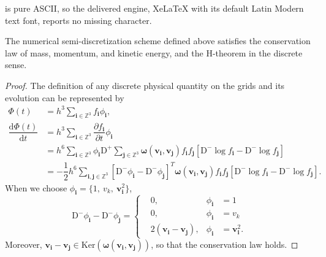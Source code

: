 \documentclass[10pt,a4paper]{amsart}
\begin{document}
is pure ASCII, so the delivered engine, XeLaTeX with its default Latin Modern text font, reports no missing character.
\begin{proposition}
    The numerical semi-discretization scheme defined above satisfies the conservation law of mass, momentum, and kinetic energy, and the H-theorem in the discrete sense.
\end{proposition}

\begin{proof}
The definition of any discrete physical quantity on the grids and its evolution can be represented by
\begin{equation}
    \begin{aligned}
        \Phi(t) &= h^{3} \sum_{\boldsymbol{i}\in\mathbb{Z}^{3}} f_{\boldsymbol{i}} \phi_{\boldsymbol{i}} , \\
        \dfrac{\mathrm{d} \Phi(t)}{\mathrm{d} t} &=  h^{3} \sum_{\boldsymbol{i}\in\mathbb{Z}^{3}} \dfrac{\partial f_{\boldsymbol{i}}}{\partial t} \phi_{\boldsymbol{i}} \\
        &= h^{6} \sum_{\boldsymbol{i}\in\mathbb{Z}^{3}} \phi_{\boldsymbol{i}} \mathrm{D}^{+} \sum_{\boldsymbol{j}\in\mathbb{Z}^{3}} \boldsymbol{\omega}(\boldsymbol{v}_{\boldsymbol{i}}, \boldsymbol{v}_{\boldsymbol{j}}) f_{\boldsymbol{i}} f_{\boldsymbol{j}} \left[ \mathrm{D}^{-} \log f_{\boldsymbol{i}} - \mathrm{D}^{-} \log f_{\boldsymbol{j}} \right] \\
        &= -\dfrac{1}{2} h^{6} \sum_{\boldsymbol{i},\boldsymbol{j}\in\mathbb{Z}^{3}} \left[ \mathrm{D}^{-} \phi_{\boldsymbol{i}} - \mathrm{D}^{-} \phi_{\boldsymbol{j}} \right]^{T} \boldsymbol{\omega}(\boldsymbol{v}_{\boldsymbol{i}}, \boldsymbol{v}_{\boldsymbol{j}}) f_{\boldsymbol{i}} f_{\boldsymbol{j}} \left[ \mathrm{D}^{-} \log f_{\boldsymbol{i}} - \mathrm{D}^{-} \log f_{\boldsymbol{j}} \right] .
    \end{aligned}
\end{equation}
%
When we choose $\phi_{\boldsymbol{i}} = \{1, ~ v_{k},~ \boldsymbol{v}_{\boldsymbol{i}}^{2} \}$,
\begin{equation}
	\mathrm{D}^{-} \phi_{\boldsymbol{i}} - \mathrm{D}^{-} \phi_{\boldsymbol{j}} = \left\{
	\begin{aligned}
		&0 , & \phi_{\boldsymbol{i}} &= 1 \\
		&0 , & \phi_{\boldsymbol{i}} &= v_{k} \\
		&2(\boldsymbol{v}_{\boldsymbol{i}} - \boldsymbol{v}_{\boldsymbol{j}}) , & \phi_{\boldsymbol{i}} &= \boldsymbol{v}_{\boldsymbol{i}}^{2} .
	\end{aligned}
	\right.
\end{equation}
%
Moreover, $\boldsymbol{v}_{\boldsymbol{i}} - \boldsymbol{v}_{\boldsymbol{j}} \in \text{Ker}(\boldsymbol{\omega}(\boldsymbol{v}_{\boldsymbol{i}}, \boldsymbol{v}_{\boldsymbol{j}}))$, so that the conservation law holds.


\end{proof}
\end{document}

